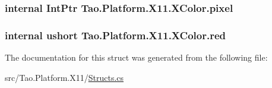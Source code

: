 \hypertarget{struct_tao_1_1_platform_1_1_x11_1_1_x_color_a8b1976250885add0db5cb35d5c5ee33f}{
\subsubsection[{pixel}]{\setlength{\rightskip}{0pt plus 5cm}internal IntPtr {\bf Tao.Platform.X11.XColor.pixel}}}
\label{struct_tao_1_1_platform_1_1_x11_1_1_x_color_a8b1976250885add0db5cb35d5c5ee33f}
\hypertarget{struct_tao_1_1_platform_1_1_x11_1_1_x_color_a1c281328bb943945a2384f73ac16d5cc}{
\subsubsection[{red}]{\setlength{\rightskip}{0pt plus 5cm}internal ushort {\bf Tao.Platform.X11.XColor.red}}}
\label{struct_tao_1_1_platform_1_1_x11_1_1_x_color_a1c281328bb943945a2384f73ac16d5cc}


The documentation for this struct was generated from the following file:\begin{DoxyCompactItemize}
\item 
src/Tao.Platform.X11/\hyperlink{_structs_8cs}{Structs.cs}\end{DoxyCompactItemize}
